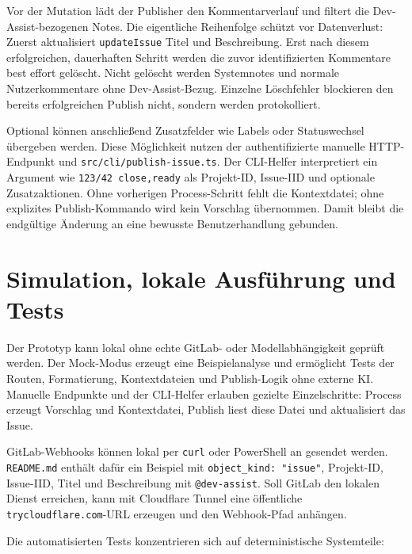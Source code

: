 \documentclass[12pt,a4paper,oneside]{scrreprt}
\begin{document}
Vor der Mutation lädt der Publisher den Kommentarverlauf und filtert die Dev-Assist-bezogenen Notes. Die eigentliche Reihenfolge schützt vor Datenverlust: Zuerst aktualisiert \texttt{updateIssue} Titel und Beschreibung. Erst nach diesem erfolgreichen, dauerhaften Schritt werden die zuvor identifizierten Kommentare best effort gelöscht. Nicht gelöscht werden Systemnotes und normale Nutzerkommentare ohne Dev-Assist-Bezug. Einzelne Löschfehler blockieren den bereits erfolgreichen Publish nicht, sondern werden protokolliert.

Optional können anschließend Zusatzfelder wie Labels oder Statuswechsel übergeben werden. Diese Möglichkeit nutzen der authentifizierte manuelle HTTP-Endpunkt und \texttt{src/cli/publish-issue.ts}. Der CLI-Helfer interpretiert ein Argument wie \texttt{123/42 close,ready} als Projekt-ID, Issue-IID und optionale Zusatzaktionen. Ohne vorherigen Process-Schritt fehlt die Kontextdatei; ohne explizites Publish-Kommando wird kein Vorschlag übernommen. Damit bleibt die endgültige Änderung an eine bewusste Benutzerhandlung gebunden.

\section{Simulation, lokale Ausführung und Tests}

Der Prototyp kann lokal ohne echte GitLab- oder Modellabhängigkeit geprüft werden. Der Mock-Modus erzeugt eine Beispielanalyse und ermöglicht Tests der Routen, Formatierung, Kontextdateien und Publish-Logik ohne externe KI. Manuelle Endpunkte und der CLI-Helfer erlauben gezielte Einzelschritte: Process erzeugt Vorschlag und Kontextdatei, Publish liest diese Datei und aktualisiert das Issue.

GitLab-Webhooks können lokal per \texttt{curl} oder PowerShell an  gesendet werden. \texttt{README.md} enthält dafür ein Beispiel mit \texttt{object\_kind: "issue"}, Projekt-ID, Issue-IID, Titel und Beschreibung mit \texttt{@dev-assist}. Soll GitLab den lokalen Dienst erreichen, kann  mit Cloudflare Tunnel eine öffentliche \texttt{trycloudflare.com}-URL erzeugen und den Webhook-Pfad anhängen.

Die automatisierten Tests konzentrieren sich auf deterministische Systemteile:
\end{document}
